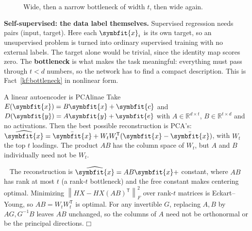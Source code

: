 \documentclass[11pt]{article}
\newcommand{\bm}[1]{\symbfit{#1}}
\newenvironment{proofsketch}{\par\noindent{\itshape Proof.}\ }{\hfill$\mdlgwhtsquare$\par}
\newcommand{\R}{\mathbb{R}}
\newcommand{\vx}{\bm{x}}
\newcommand{\xbar}{\bar{\bm{x}}}
\newcommand{\T}{^{\mathsf T}}
\newcommand{\norm}[1]{\left\lVert #1\right\rVert}
\newcommand{\Fro}[1]{\left\lVert #1\right\rVert_F}
\begin{document}
\begin{figure}[htbp]
\centering
{}
\caption{Wide, then a narrow bottleneck of width $t$, then wide again.}
\label{fig:hourglass}
\end{figure}

\begin{intuition}
\textbf{Self-supervised: the data label themselves.} Supervised regression needs pairs (input, target). Here each $\vx_i$ is its own target, so an unsupervised problem is turned into ordinary supervised training with no external labels. The target alone would be trivial, since the identity map scores zero. The \textbf{bottleneck} is what makes the task meaningful: everything must pass through $t<d$ numbers, so the network has to find a compact description. This is Fact~\ref{kf:bottleneck} in nonlinear form.
\end{intuition}

\begin{proposition}{A linear autoencoder is PCA}{linae}
Take $E(\vx)=B\vx+\bm c$ and $D(\bm y)=A\bm y+\bm e$ with $A\in\R^{d\times t}$, $B\in\R^{t\times d}$ and no activations. Then the best possible reconstruction is PCA's: $\widehat{\vx}=\xbar+W_tW_t\T(\vx-\xbar)$, with $W_t$ the top $t$ loadings. The product $AB$ has the column space of $W_t$, but $A$ and $B$ individually need not be $W_t$.
\end{proposition}
\begin{proofsketch}
The reconstruction is $\widehat{\vx}=AB\vx+$ constant, where $AB$ has rank at most $t$ (a rank-$t$ bottleneck) and the free constant makes centering optimal. Minimizing $\Fro{HX-HX(AB)\T}^2$ over rank-$t$ matrices is Eckart--Young, so $AB=W_tW_t\T$ is optimal. For any invertible $G$, replacing $A,B$ by $AG,G^{-1}B$ leaves $AB$ unchanged, so the columns of $A$ need not be orthonormal or be the principal directions.
\end{proofsketch}
\end{document}
